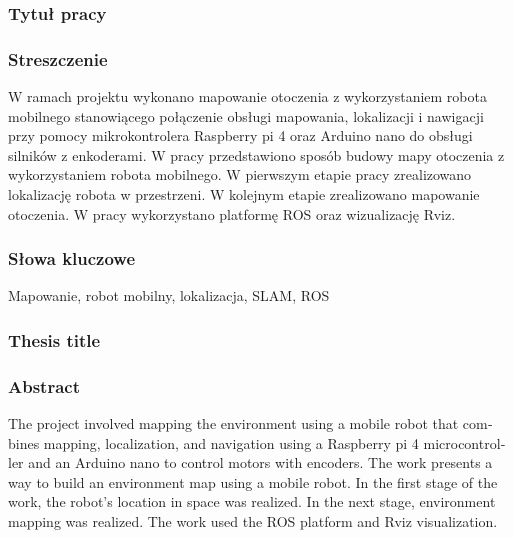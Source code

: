 \documentclass[a4paper,twoside,12pt]{book}
\begin{document}


\cleardoublepage

\rmfamily\normalfont
\pagestyle{empty}



\subsubsection*{Tytuł pracy} 
\Title

\subsubsection*{Streszczenie}  
W ramach projektu wykonano mapowanie otoczenia z wykorzystaniem robota mobilnego stanowiącego połączenie obsługi mapowania, lokalizacji i nawigacji przy pomocy mikrokontrolera Raspberry pi 4 oraz Arduino nano do obsługi silników z enkoderami. W pracy przedstawiono sposób budowy mapy otoczenia z wykorzystaniem robota mobilnego. W pierwszym etapie pracy zrealizowano lokalizację robota w przestrzeni. W kolejnym etapie zrealizowano mapowanie otoczenia. W pracy wykorzystano platformę ROS oraz wizualizację Rviz.
\subsubsection*{Słowa kluczowe} 
Mapowanie, robot mobilny, lokalizacja, SLAM, ROS
\subsubsection*{Thesis title} 
\begin{otherlanguage}{british}
\TitleAlt
\end{otherlanguage}

\subsubsection*{Abstract} 
\begin{otherlanguage}{british}
The project involved mapping the environment using a mobile robot that combines mapping, localization, and navigation using a Raspberry pi 4 microcontroller and an Arduino nano to control motors with encoders. The work presents a way to build an environment map using a mobile robot. In the first stage of the work, the robot's location in space was realized. In the next stage, environment mapping was realized. The work used the ROS platform and Rviz visualization.
\end{otherlanguage}
\end{document}
